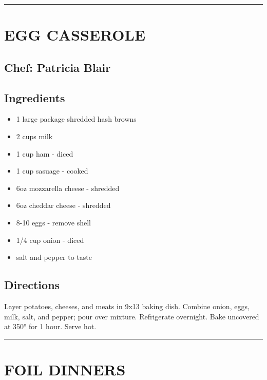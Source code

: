 \documentclass[
]{book}
\providecommand{\tightlist}{%
  \setlength{\itemsep}{0pt}\setlength{\parskip}{0pt}}
\begin{document}
\begin{center}\rule{0.5\linewidth}{0.5pt}\end{center}

\hypertarget{egg-casserole}{%
\section*{EGG CASSEROLE}\label{egg-casserole}}


\hypertarget{chef-patricia-blair-11}{%
\subsection*{Chef: Patricia Blair}\label{chef-patricia-blair-11}}


\hypertarget{ingredients-55}{%
\subsection*{Ingredients}\label{ingredients-55}}


\begin{itemize}
\tightlist
\item
  1 large package shredded hash browns
\item
  2 cups milk
\item
  1 cup ham - diced
\item
  1 cup sasuage - cooked
\item
  6oz mozzarella cheese - shredded
\item
  6oz cheddar cheese - shredded
\item
  8-10 eggs - remove shell
\item
  1/4 cup onion - diced
\item
  salt and pepper to taste
\end{itemize}

\hypertarget{directions-55}{%
\subsection*{Directions}\label{directions-55}}


Layer potatoes, cheeses, and meats in 9x13 baking dish. Combine onion, eggs,
milk, salt, and pepper; pour over mixture. Refrigerate overnight. Bake uncovered at 350° for 1 hour.
Serve hot.

\begin{center}\rule{0.5\linewidth}{0.5pt}\end{center}

\hypertarget{foil-dinners}{%
\section*{FOIL DINNERS}\label{foil-dinners}}
\end{document}
